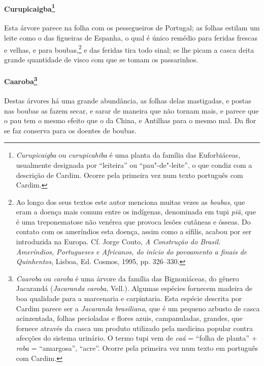 \paragraph{Curupicaigba\footnote{ \textit{Curupicaigba} ou
\textit{curupicahiba} é uma planta da família das Euforbiáceas,
usualmente designada por ``leiteira'' ou ``pau"-de"-leite'', o que condiz
com a descrição de Cardim. Ocorre pela primeira vez num texto português
com Cardim.}} Esta árvore parece na folha com os pessegueiros
de Portugal; as folhas estilam um leite como o das figueiras de
Espanha, o qual é único remédio para feridas frescas e velhas, e para
boubas,\footnote{ Ao longo dos seus textos este autor menciona muitas
vezes as \textit{boubas}, que eram a doença mais comum entre os
indígenas, denominada em tupi \textit{piã}, que é uma treponematose não
venérea que provoca lesões cutâneas e ósseas. Do contato com os
ameríndios esta doença, assim como a sífilis, acabou por ser introduzida na
Europa. Cf. Jorge Couto, \textit{A Construção do Brasil. Ameríndios,
Portugueses e Africanos, do início do povoamento a finais de
Quinhentos}, Lisboa, Ed. Cosmos, 1995, pp. 326--330.} e das feridas
tira todo sinal; se lhe picam a casca deita grande quantidade de visco
com que se tomam os passarinhos.

\paragraph{Caaroba\footnote{ \textit{Caaroba} ou \textit{caroba} é
uma árvore da família das Bignoniáceas, do gênero Jacarandá
(\textit{Jacaranda caroba}, Vell.). Algumas espécies fornecem madeira
de boa qualidade para a marcenaria e carpintaria. Esta espécie descrita
por Cardim parece ser a \textit{Jacaranda brasiliana}, que é um pequeno
arbusto de casca acinzentada, folhas pecioladas e flores azuis,
campanuladas, grandes, que fornece através da casca um produto
utilizado pela medicina popular contra afecções do sistema urinário. O
termo tupi vem de \textit{caá} = ``folha de planta'' + \textit{roba} = ``amargosa'', 
``acre''. Ocorre pela primeira vez num texto em português com
Cardim.}} Destas árvores há uma grande abundância, as folhas
delas mastigadas, e postas nas boubas as fazem secar, e sarar de
maneira que não tornam mais, e parece que o pau tem o mesmo efeito que
o da China, e Antilhas para o mesmo mal. Da flor se faz conserva para
os doentes de boubas.

